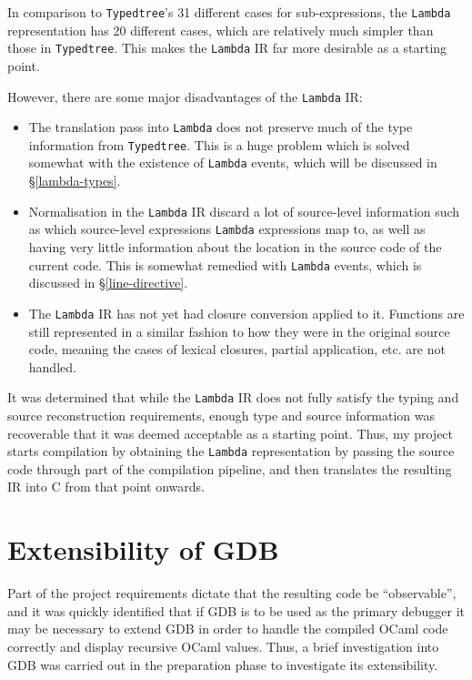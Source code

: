\documentclass[12pt,a4paper,twoside,openright]{report}
\begin{document}
In comparison to \texttt{Typedtree}'s 31 different cases for sub-expressions, 
the \texttt{Lambda} representation has 20 different cases, which are relatively 
much simpler than those in \texttt{Typedtree}. This makes the \texttt{Lambda} 
IR far more desirable as a starting point.

However, there are some major disadvantages of the \texttt{Lambda} IR:

\begin{itemize}

\item The translation pass into \texttt{Lambda} does not preserve much of the
    type information from \texttt{Typedtree}. This is a huge problem which is
    solved somewhat with the existence of \texttt{Lambda} events, which will be
    discussed in \S\ref{lambda-types}.

\item Normalisation in the \texttt{Lambda} IR discard a lot of source-level
    information such as which source-level expressions \texttt{Lambda}
    expressions map to, as well as having very little information about the
    location in the source code of the current code. This is somewhat remedied
    with \texttt{Lambda} events, which is discussed in \S\ref{line-directive}.

\item The \texttt{Lambda} IR has not yet had closure conversion applied to it.
    Functions are still represented in a similar fashion to how they were in the
    original source code, meaning the cases of lexical closures, partial
    application, etc. are not handled.

\end{itemize}

It was determined that while the \texttt{Lambda} IR does not fully satisfy the
typing and source reconstruction requirements, enough type and source
information was recoverable that it was deemed acceptable as a starting point.
Thus, my project starts compilation by obtaining the \texttt{Lambda}
representation by passing the source code through part of the compilation
pipeline, and then translates the resulting IR into C from that point onwards.

\section{Extensibility of GDB}

Part of the project requirements dictate that the resulting code be 
``observable'', and it was quickly identified that if GDB is to be used as the 
primary debugger it may be necessary to extend GDB in order to handle the 
compiled OCaml code correctly and display recursive OCaml values. Thus, a brief 
investigation into GDB was carried out in the preparation phase to investigate 
its extensibility.
\end{document}
